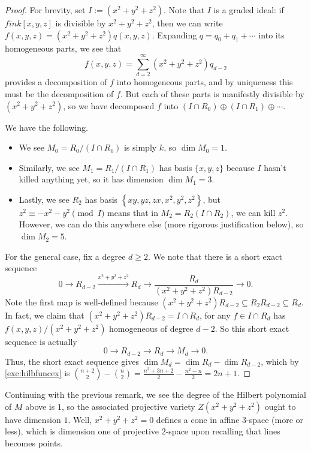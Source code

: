 \documentclass[../notes.tex]{subfiles}
\begin{document}
\begin{proof}
	For brevity, set $I:=\left(x^2+y^2+z^2\right)$. Note that $I$ is a graded ideal: if $fin k[x,y,z]$ is divisible by $x^2+y^2+z^2$, then we can write $f(x,y,z)=\left(x^2+y^2+z^2\right)q(x,y,z)$. Expanding $q=q_0+q_1+\cdots$ into its homogeneous parts, we see that
	\[f(x,y,z)=\sum_{d=2}^\infty\left(x^2+y^2+z^2\right)q_{d-2}\]
	provides a decomposition of $f$ into homogeneous parts, and by uniqueness this must be the decomposition of $f$. But each of these parts is manifestly divisible by $\left(x^2+y^2+z^2\right)$, so we have decomposed $f$ into $(I\cap R_0)\oplus(I\cap R_1)\oplus\cdots$.

	We have the following.
	\begin{itemize}
		\item We see $M_0=R_0/(I\cap R_0)$ is simply $k$, so $\dim M_0=1$.
		\item Similarly, we see $M_1=R_1/(I\cap R_1)$ has basis $\{x,y,z\}$ because $I$ hasn't killed anything yet, so it has dimension $\dim M_1=3$.
		\item Lastly, we see $R_2$ has basis $\left\{xy,yz,zx,x^2,y^2,z^2\right\}$, but $z^2\equiv-x^2-y^2\pmod I$ means that in $M_2=R_2(I\cap R_2)$, we can kill $z^2$. However, we can do this anywhere else (more rigorous justification below), so $\dim M_2=5$.
	\end{itemize}
	For the general case, fix a degree $d\ge2$. We note that there is a short exact sequence
	\[0\to R_{d-2}\stackrel{x^2+y^2+z^2}\to R_d\to\frac{R_d}{\left(x^2+y^2+z^2\right)R_{d-2}}\to0.\]
	Note the first map is well-defined because $\left(x^2+y^2+z^2\right)R_{d-2}\subseteq R_2R_{d-2}\subseteq R_d$. In fact, we claim that $\left(x^2+y^2+z^2\right)R_{d-2}=I\cap R_d$, for any $f\in I\cap R_d$ has $f(x,y,z)/\left(x^2+y^2+z^2\right)$ homogeneous of degree $d-2$. So this short exact sequence is actually
	\[0\to R_{d-2}\to R_d\to M_d\to 0.\]
	Thus, the short exact sequence gives $\dim M_d=\dim R_d-\dim R_{d-2}$, which by \autoref{exe:hilbfuncex} is $\binom{n+2}2-\binom n2=\frac{n^2+3n+2}2-\frac{n^2-n}2=2n+1$.
\end{proof}
\begin{remark}
	Continuing with the previous remark, we see the degree of the Hilbert polynomial of $M$ above is $1$, so the associated projective variety $Z\left(x^2+y^2+z^2\right)$ ought to have dimension $1$. Well, $x^2+y^2+z^2=0$ defines a cone in affine $3$-space (more or less), which is dimension one of projective $2$-space upon recalling that lines becomes points.
\end{remark}
\end{document}
